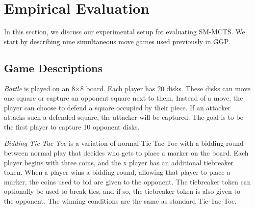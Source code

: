 \documentclass[conference]{IEEEtran}
\begin{document}


\section{Empirical Evaluation}
\label{sec:exp}

In this section, we discuss our experimental setup for evaluating SM-MCTS.
We start by describing nine simultaneous move games used previously in GGP. 


\subsection{Game Descriptions}
\label{subsec:games}

\textit{Battle} is played on an 8$\times$8 board. Each player has 20 disks. These disks can move one square or 
capture an opponent square next to them. Instead of a move, the player can choose to defend a square occupied by their 
piece. If an attacker attacks such a defended square, the attacker will be captured. The goal is to be the first player 
to capture 10 opponent disks. 

\textit{Bidding Tic-Tac-Toe} is a variation of normal Tic-Tac-Toe with a bidding round between 
normal play that decides who gets to place a marker on the board. Each player begins with three coins, and the 
\textsc{x} player has an additional tiebreaker token. When a player wins a bidding round, allowing that player to 
place a marker, the coins used to bid are given to the opponent. The tiebreaker token can optionally be used to break 
ties, and if so, the tiebreaker token is also given to the opponent. The winning conditions are the same as 
standard Tic-Tac-Toe. 
\end{document}

